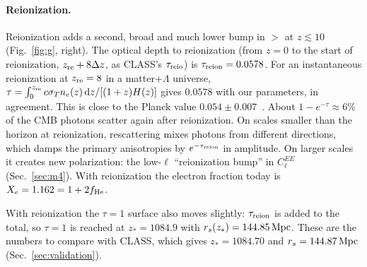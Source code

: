 \paragraph*{Reionization.} Reionization adds a second, broad and much lower bump in $\gt$ at $z\lesssim10$
(Fig.~\ref{fig:g}, right). The optical depth to reionization (from $z=0$ to the start of reionization,
$z_{\rm re}+8\Delta z$, as CLASS's $\tau_{\rm reio}$) is $\tau_{\rm reion}=0.0578$. For an instantaneous
reionization at $z_{\rm re}=8$ in a matter+$\Lambda$ universe,
$\tau=\int_0^{z_{\rm re}}c\sigma_Tn_e(z)\,\mathrm{d} z/[(1+z)H(z)]$ gives $0.0578$ with our parameters, in agreement. This is
close to the Planck value $0.054\pm0.007$~\cite{Planck2018params}. About $1-e^{-\tau}\approx6\%$ of the CMB photons
scatter again after reionization. On scales smaller than the horizon at reionization, rescattering mixes photons from
different directions, which damps the primary anisotropies by $e^{-\tau_{\rm reion}}$ in amplitude. On larger scales it
creates new polarization: the low-$\ell$ ``reionization bump'' in $C_\ell^{EE}$ (Sec.~\ref{sec:m4}). With reionization
the electron fraction today is $X_e=1.162=1+2f_{\rm He}$.

With reionization the $\tau=1$ surface also moves slightly: $\tau_{\rm reion}$ is added to the total, so $\tau=1$ is
reached at $z_*=1084.9$ with $r_s(z_*)=144.85\,\mathrm{Mpc}$. These are the numbers to compare with CLASS, which gives
$z_*=1084.70$ and $r_s=144.87\,\mathrm{Mpc}$ (Sec.~\ref{sec:validation}).
